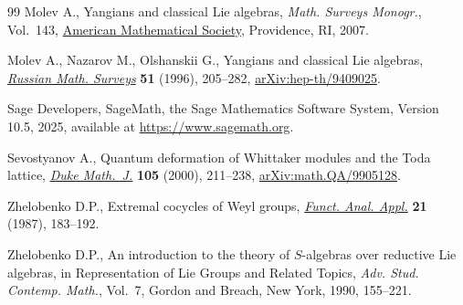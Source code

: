 \documentclass[pdftex]{sigma}
\numberwithin{equation}{section}
\begin{document}
\begin{thebibliography}{99}
Molev A., Yangians and classical {L}ie algebras, \textit{Math. Surveys
 Monogr.}, Vol.~143, \href{https://doi.org/10.1090/surv/143}{American Mathematical Society}, Providence, RI, 2007.

Molev A., Nazarov M., Olshanskii G., Yangians and classical {L}ie algebras,
  \href{https://doi.org/10.1070/RM1996v051n02ABEH002772}{\textit{Russian Math. Surveys}} \textbf{51} (1996), 205--282,
 \href{https://arxiv.org/abs/hep-th/9409025}{arXiv:hep-th/9409025}.

Sage Developers, {S}ageMath, the {S}age {M}athematics {S}oftware {S}ystem,
 {V}ersion 10.5, 2025, available at \url{https://www.sagemath.org}.

Sevostyanov A., Quantum deformation of {W}hittaker modules and the {T}oda
 lattice, \href{https://doi.org/10.1215/S0012-7094-00-10522-4}{\textit{Duke Math.~J.}} \textbf{105} (2000), 211--238,
 \href{https://arxiv.org/abs/math.QA/9905128}{arXiv:math.QA/9905128}.

Zhelobenko D.P., Extremal cocycles of {W}eyl groups, \href{https://doi.org/10.1007/BF02577133}{\textit{Funct. Anal.
 Appl.}} \textbf{21} (1987), 183--192.

Zhelobenko D.P., An introduction to the theory of {$S$}-algebras over reductive
 {L}ie algebras, in Representation of {L}ie {G}roups and {R}elated {T}opics,
 \textit{Adv. Stud. Contemp. Math.}, Vol.~7, Gordon and Breach, New York,
 1990, 155--221.

\end{thebibliography}\LastPageEnding
	
	
\end{document}
